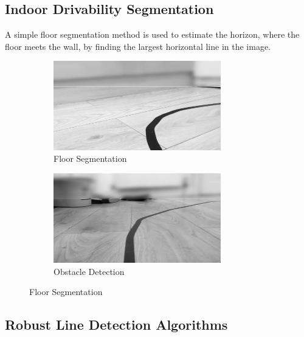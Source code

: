         \subsection{Indoor Drivability Segmentation}
        A simple floor segmentation method is used to estimate the horizon, where the floor meets the wall, 
        by finding the largest horizontal line in the image. 

        \begin{figure}[H]
            \centering
            \begin{subfigure}[b]{0.45\textwidth}
                \includegraphics[width=0.8\textwidth]{ApprachWallCurve.png}
                \caption{Floor Segmentation}
                \label{fig:FloorSegmentation}
            \end{subfigure}
            \hfill
            \begin{subfigure}[b]{0.45\textwidth}
                \includegraphics[width=0.8\textwidth]{Obstacles.png}
                \caption{Obstacle Detection}
                \label{fig:ObstacleDetection}
            \end{subfigure}
            \caption{Floor Segmentation}
        \end{figure}

        \pagebreak{}
        \subsection{Robust Line Detection Algorithms}

